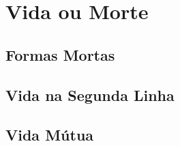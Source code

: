 \part{Vida ou Morte}




% 
% 
% 

\chapter{Formas Mortas}
\emptypage
\emptypage
\emptypage

\chapter{Vida na Segunda Linha}
\emptypage
\emptypage
\emptypage

\chapter{Vida Mútua}
\emptypage
\emptypage
\emptypage